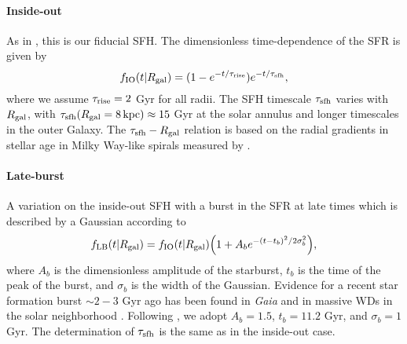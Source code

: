 \documentclass[twocolumn,twocolappendix,linenumbers]{aastex631}
\begin{document}
\paragraph{Inside-out} As in , this is our fiducial SFH. The dimensionless time-dependence of the SFR is given by
\begin{equation}
    f_{\rm IO}(t|R_{\rm gal}) = (1 - e^{-t/\tau_{\rm rise}}) e^{-t/\tau_{\rm sfh}},
    \label{eq:insideout-sfh}
\end{equation}
where we assume $\tau_{\rm rise}=2$ Gyr for all radii. The SFH timescale $\tau_{\rm sfh}$ varies with $R_{\rm gal}$, with $\tau_{\rm sfh}(R_{\rm gal}=8\,\rm{kpc})\approx15$ Gyr at the solar annulus and longer timescales in the outer Galaxy. The $\tau_{\rm sfh} - R_{\rm gal}$ relation is based on the radial gradients in stellar age in Milky Way-like spirals measured by \citet[][see Section 2.5 of  for details]{Sanchez2020-StarFormationTimescales}.

\paragraph{Late-burst} A variation on the inside-out SFH with a burst in the SFR at late times which is described by a Gaussian according to
\begin{equation}
    f_{\rm LB}(t|R_{\rm gal}) = f_{\rm IO}(t|R_{\rm gal}) \Big(1 + A_b e^{-(t-t_b)^2/2\sigma_b^2} \Big),
    \label{eq:lateburst-sfh}
\end{equation}
where $A_b$ is the dimensionless amplitude of the starburst, $t_b$ is the time of the peak of the burst, and $\sigma_b$ is the width of the Gaussian. 
Evidence for a recent star formation burst $\sim 2-3$ Gyr ago has been found in {\it Gaia} \citep{Mor2019-Starburst} and in massive WDs in the solar neighborhood \citep{Isern2019-Starburst}.
Following , we adopt $A_b=1.5$, $t_b=11.2$ Gyr, and $\sigma_b=1$ Gyr. The determination of $\tau_{\rm sfh}$ is the same as in the inside-out case.
\end{document}
